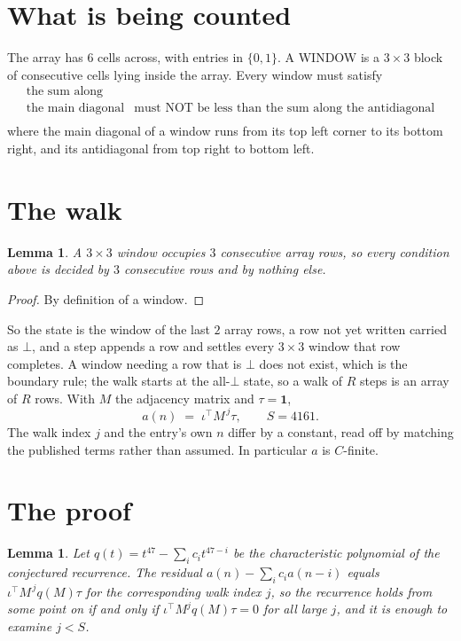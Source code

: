 \documentclass[11pt,a4paper]{article}
\theoremstyle{plain}
\newtheorem{lemma}[theorem]{Lemma}
\theoremstyle{definition}
\begin{document}
\section{What is being counted}

The array has $6$ cells across, with entries in $\{0,1\}$. A WINDOW is a $3\times3$ block
of consecutive cells lying inside the array. Every window must satisfy
\[
\begin{array}{ll}
\text{the sum along} & \text{} \\[2pt]
\text{the main diagonal} & \text{must NOT be less than the sum along the antidiagonal} \\
\end{array}
\]
where the main diagonal of a window runs from its top left corner to its bottom right, and its
antidiagonal from top right to bottom left.

\section{The walk}

\begin{lemma}\label{lem:win}
A $3\times3$ window occupies $3$ consecutive array rows, so every condition above is
decided by $3$ consecutive rows and by nothing else.
\end{lemma}

\begin{proof}
By definition of a window.
\end{proof}

So the state is the window of the last $2$ array rows, a row not yet written carried as
$\bot$, and a step appends a row and settles every $3\times3$ window that row completes. A
window needing a row that is $\bot$ does not exist, which is the boundary rule; the walk starts
at the all-$\bot$ state, so a walk of $R$ steps is an array of $R$ rows. With $M$ the adjacency
matrix and $\tau=\mathbf{1}$,
\[
a(n)\;=\;\iota^{\!\top}M^{\,j}\tau ,\qquad S=4161.
\]
The walk index $j$ and the entry's own $n$ differ by a constant, read off by matching the
published terms rather than assumed. In particular $a$ is $C$-finite.

\section{The proof}

\begin{lemma}\label{lem:crit}
Let $q(t)=t^{47}-\sum_i c_it^{47-i}$ be the characteristic polynomial of the
conjectured recurrence. The residual $a(n)-\sum_ic_ia(n-i)$ equals
$\iota^{\!\top}M^{\,j}q(M)\tau$ for the corresponding walk index $j$, so the recurrence
holds from some point on if and only if $\iota^{\!\top}M^{j}q(M)\tau=0$ for all large $j$,
and it is enough to examine $j<S$.
\end{lemma}
\end{document}
